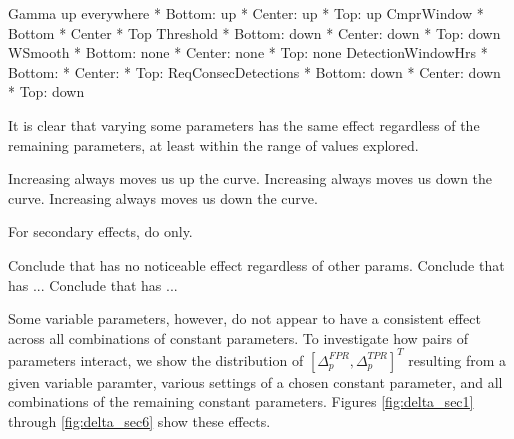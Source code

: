 
Gamma
up everywhere
* Bottom: up
* Center: up
* Top: up
CmprWindow
* Bottom
* Center
* Top
Threshold
* Bottom: down
* Center: down
* Top: down
WSmooth
* Bottom: none
* Center: none
* Top: none
DetectionWindowHrs
* Bottom:
* Center:
* Top:
ReqConsecDetections
* Bottom: down
* Center: down
* Top: down

It is clear that varying some parameters has the same effect regardless of the
remaining parameters, at least within the range of values explored. 



Increasing  always moves us up the curve.
Increasing  always moves us down the curve.
Increasing  always moves us down the curve.

For secondary effects, do only.

Conclude that  has no noticeable effect regardless of other params.
Conclude that  has ...
Conclude that  has ... 

\clearpage
Some variable parameters, however, do not appear to have a consistent effect
across all combinations of constant parameters. To investigate how pairs of
parameters interact, we show the distribution of $[\Delta_p^{FPR},
  \Delta_p^{TPR}]^T$ resulting from a given variable paramter, various settings
of a chosen constant parameter, and all combinations of the remaining constant
parameters. Figures \ref{fig:delta_sec1} through \ref{fig:delta_sec6} show these
effects.




